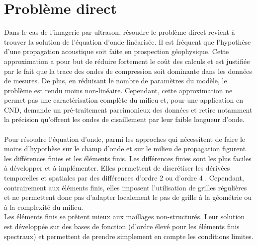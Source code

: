 

\section{Problème direct \label{pd_dir}}

Dans le cas de l'imagerie par ultrason, résoudre le problème direct revient à trouver la solution de l'équation d'onde linéarisée. Il est fréquent que l'hypothèse d'une propagation acoustique soit faite en prospection géophysique. Cette approximation a pour but de réduire fortement le coût des calculs et est justifiée par le fait que la trace des ondes de compression soit dominante dans les données de mesures. De plus, en réduisant le nombre de paramètres du modèle, le problème est rendu moins non-linéaire. Cependant, cette approximation ne permet pas une caractérisation complète du milieu et, pour une application en CND, demande un pré-traitement parcimonieux des données et retire notamment la précision qu'offrent les ondes de cisaillement par leur faible longueur d'onde.\\~\\




 Pour résoudre l'équation d'onde, parmi les approches qui nécessitent de faire le moins d'hypothèse sur le champ d'onde et sur le milieu de propagation figurent les différences finies et les éléments finis. Les différences finies sont les plus faciles à développer et à implémenter. Elles permettent de discrétiser les dérivées temporelles et spatiales par des différences d'ordre 2 \citep{virieux_86} ou d'ordre 4 \citep{levander}. Cependant, contrairement aux éléments finis, elles imposent l'utilisation de grilles régulières et ne permettent donc pas d'adapter localement le pas de grille à la géométrie ou à la complexité du milieu. \\ Les éléments finis se prêtent mieux aux maillages non-structurés. Leur solution est développée sur des bases de fonction (d'ordre élevé pour les éléments finis spectraux) et permettent de prendre simplement en compte les conditions limites.\\
 
